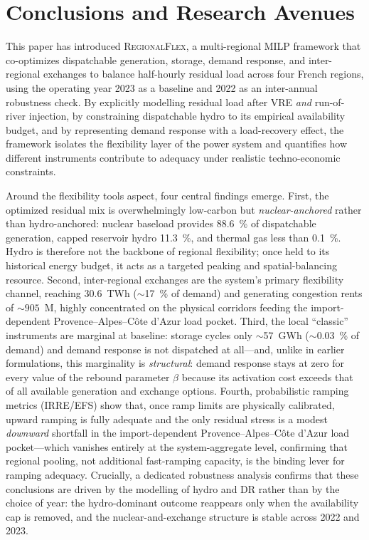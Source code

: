 \documentclass[12pt]{article}
\begin{document}


\section{Conclusions and Research Avenues}
\label{sec:conclusions}

This paper has introduced \textsc{RegionalFlex}, a multi-regional MILP framework 
that co-optimizes dispatchable generation, storage, demand response, and inter-regional 
exchanges to balance half-hourly residual load across four French regions, using the 
operating year 2023 as a baseline and 2022 as an inter-annual robustness check. 
By explicitly modelling residual load after VRE \emph{and} run-of-river injection, by 
constraining dispatchable hydro to its empirical availability budget, and by representing 
demand response with a load-recovery effect, the framework isolates the flexibility layer 
of the power system and quantifies how different instruments contribute to adequacy under 
realistic techno-economic constraints.

Around the flexibility tools aspect, four central findings emerge. First, the optimized residual mix is overwhelmingly 
low-carbon but \emph{nuclear-anchored} rather than hydro-anchored: nuclear baseload provides \SI{88.6}{\percent} 
of dispatchable generation, capped reservoir hydro \SI{11.3}{\percent}, and thermal gas less than \SI{0.1}{\percent}. 
Hydro is therefore not the backbone of regional flexibility; once held to its historical energy budget, it acts as a 
targeted peaking and spatial-balancing resource. Second, inter-regional exchanges are the system's primary flexibility 
channel, reaching \SI{30.6}{TWh} (\(\sim\)\SI{17}{\percent} of demand) and generating congestion rents of \(\sim 905\)~M\texteuro, 
highly concentrated on the physical corridors feeding the import-dependent Provence--Alpes--Côte d'Azur load pocket. Third, the local 
``classic'' instruments are marginal at baseline: storage cycles only \(\sim\)\SI{57}{GWh} (\(\sim\)\SI{0.03}{\percent} of demand) and demand response is not dispatched 
at all---and, unlike in earlier formulations, this marginality is \emph{structural}: demand response stays at zero for every value of the rebound 
parameter $\beta$ because its activation cost exceeds that of all available generation and exchange options. Fourth, probabilistic ramping 
metrics (IRRE/EFS) show that, once ramp limits are physically calibrated, upward ramping is fully adequate and the only residual 
stress is a modest \emph{downward} shortfall in the import-dependent Provence--Alpes--Côte d'Azur load pocket---which vanishes 
entirely at the system-aggregate level, confirming that regional pooling, not additional fast-ramping capacity, is the binding 
lever for ramping adequacy. Crucially, a dedicated robustness analysis 
confirms that these conclusions are driven by the modelling of hydro and DR rather than by the choice of year: the 
hydro-dominant outcome reappears only when the availability cap is removed, and the nuclear-and-exchange structure is stable 
across 2022 and 2023.
\end{document}
